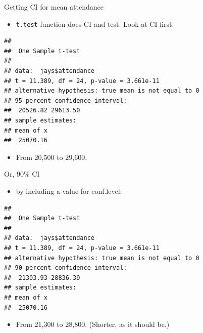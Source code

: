 \documentclass[ignorenonframetext,]{beamer}
\newenvironment{Shaded}{\begin{snugshade}}{\end{snugshade}}
\newcommand{\DataTypeTok}[1]{\textcolor[rgb]{0.13,0.29,0.53}{#1}}
\newcommand{\FloatTok}[1]{\textcolor[rgb]{0.00,0.00,0.81}{#1}}
\newcommand{\KeywordTok}[1]{\textcolor[rgb]{0.13,0.29,0.53}{\textbf{#1}}}
\newcommand{\NormalTok}[1]{#1}
\newcommand{\OperatorTok}[1]{\textcolor[rgb]{0.81,0.36,0.00}{\textbf{#1}}}
\providecommand{\tightlist}{%
  \setlength{\itemsep}{0pt}\setlength{\parskip}{0pt}}
\begin{document}
\begin{frame}[fragile]{Getting CI for mean attendance}
\protect\hypertarget{getting-ci-for-mean-attendance}{}

\begin{itemize}
\tightlist
\item
  \texttt{t.test} function does CI and test. Look at CI first:
\end{itemize}

\begin{Shaded}
\end{Shaded}

\begin{verbatim}
## 
##  One Sample t-test
## 
## data:  jays$attendance
## t = 11.389, df = 24, p-value = 3.661e-11
## alternative hypothesis: true mean is not equal to 0
## 95 percent confidence interval:
##  20526.82 29613.50
## sample estimates:
## mean of x 
##  25070.16
\end{verbatim}

\begin{itemize}
\tightlist
\item
  From 20,500 to 29,600.
\end{itemize}

\end{frame}

\begin{frame}[fragile]{Or, 90\% CI}
\protect\hypertarget{or-90-ci}{}

\begin{itemize}
\tightlist
\item
  by including a value for conf.level:
\end{itemize}

\begin{Shaded}
\end{Shaded}

\begin{verbatim}
## 
##  One Sample t-test
## 
## data:  jays$attendance
## t = 11.389, df = 24, p-value = 3.661e-11
## alternative hypothesis: true mean is not equal to 0
## 90 percent confidence interval:
##  21303.93 28836.39
## sample estimates:
## mean of x 
##  25070.16
\end{verbatim}

\begin{itemize}
\tightlist
\item
  From 21,300 to 28,800. (Shorter, as it should be.)
\end{itemize}

\end{frame}
\end{document}
